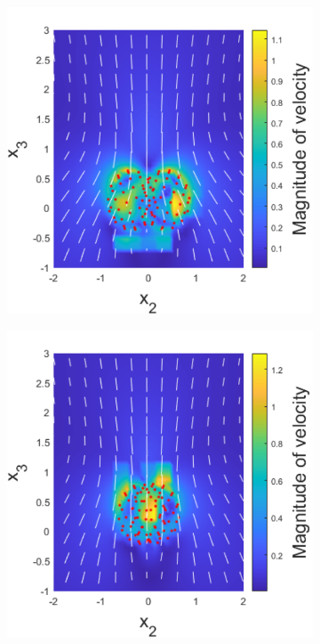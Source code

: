 \begin{figure}
\begin{subfigure}[b]{0.22\textwidth}
    \caption[]{\label{fig:PairB}}
\end{subfigure}
\begin{subfigure}[b]{0.22\textwidth}
    \centering
    \includegraphics[width=\textwidth]{Images/squirmers/Pair-3.pdf}
    \caption[]{\label{fig:PairC}}
\end{subfigure}
\begin{subfigure}[b]{0.22\textwidth}
    \centering
    \includegraphics[width=\textwidth]{Images/squirmers/Pair-4.pdf}

\end{subfigure}
\end{figure}
